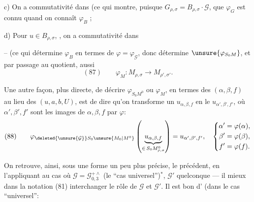 c) On a commutativité dans
(ce qui montre, puisque $G_{\rho,\sigma}=B_{\rho,\sigma}\cdot\mathcal G$, que $\varphi_G$ est connu quand on connaît $\varphi_B$ ;

d) Pour $u\in B_{\rho,\sigma}$,  , on a commutativité dans


-- (ce qui détermine $\varphi_B$ en termes de $\varphi=\varphi_{\mathcal G}$, donc  détermine $\unsure{\varphi_{S_0M}}$, et par passage au quotient, aussi
\[
 (87)\qquad \varphi_M:M_{\rho,\sigma}\longrightarrow M_{\rho',\sigma'}.
\]

Une autre façon, plus directe, de décrire $\varphi_{S_0M^0}$ ou $\varphi_M$, en termes des   $(\alpha,\beta,f)$ au lieu des $(u,a,b,U)$, est de dire qu'on  transforme un $u_{\alpha,\beta,f}$ en le $u_{\alpha',\beta',f'}$, où $\alpha',\beta',f'$ sont les images de $\alpha,\beta,f$ par $\varphi$:
\[
 (88)\qquad
 \varphi_{\deleted{\unsure{\mathcal G}}S_0\unsure{M_0|M^0}}
 \left(\underbrace{u_{\alpha,\beta,f}}_{\in\,S_0M^0_{\rho,\sigma}}\right)
 =u_{\alpha',\beta',f'},\quad
 \left\{\begin{aligned}
 \alpha'&=\varphi(\alpha),\\
 \beta'&=\varphi(\beta),\\
 f'&=\varphi(f).
 \end{aligned}\right.
\]

On retrouve, ainsi, sous une forme un peu plus précise, le  précédent, en  l'appliquant au cas où $\mathcal G=\mathcal G_{0,3}^{+\wedge}$ (le ``cas universel'')$^*$, $\mathcal G'$ quelconque --- il  mieux dans la notation (81) interchanger le rôle de $\mathcal G$ et $\mathcal G'$.
Il est bon d' (dans le cas ``universel'':

